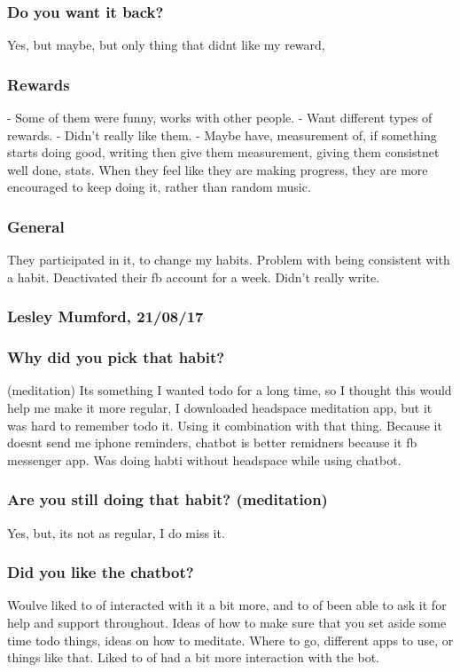 \documentclass{scaffold/sigchi}
\begin{document}
\subsubsection{Do you want it back?}
Yes, but maybe, but only thing that didnt like my reward,

\subsubsection{Rewards}
- Some of them were funny, works with other people.
- Want different types of rewards.
- Didn't really like them.
- Maybe have, measurement of, if something starts doing good, writing then give them measurement, giving them consistnet well done, stats. When they feel like they are making progress, they are more encouraged to keep doing it, rather than random music.

\subsubsection{General}
They participated in it, to change my habits. Problem with being consistent with a habit.
Deactivated their fb account for a week. Didn't really write.

\subsubsection{Lesley Mumford, 21/08/17}

\subsubsection{Why did you pick that habit?} (meditation)
Its something I wanted todo for a long time, so I thought this would help me make it more regular, I downloaded headspace meditation app, but it was hard to remember todo it. Using it combination with that thing. Because it doesnt send me iphone reminders, chatbot is better remidners because it fb messenger app. Was doing habti without headspace while using chatbot.

\subsubsection{Are you still doing that habit? (meditation)}
Yes, but, its not as regular, I do miss it.

\subsubsection{Did you like the chatbot?}
Woulve liked to of interacted with it a bit more, and to of been able to ask it for help and support throughout. Ideas of how to make sure that you set aside some time todo things, ideas on how to meditate. Where to go, different apps to use, or things like that. Liked to of had a bit more interaction with the bot.
\end{document}
